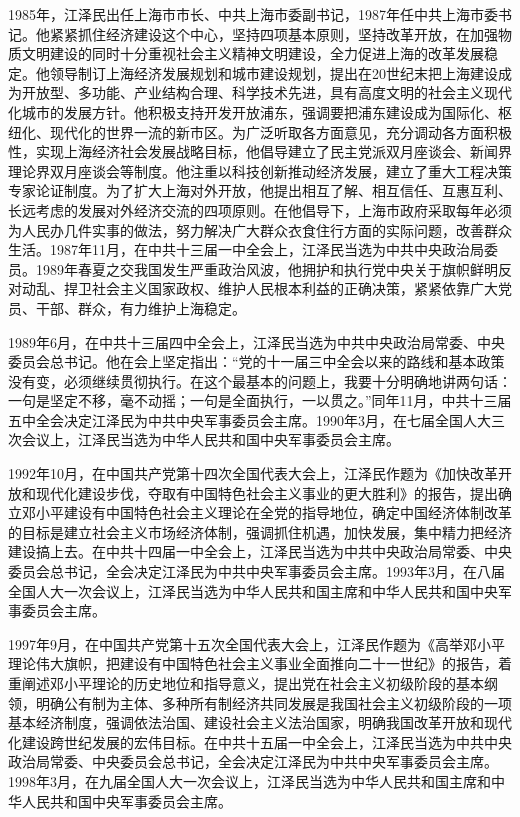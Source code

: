 \documentclass[UTF8, 11pt, oneside]{ctexart}
\begin{document}
1985年，江泽民出任上海市市长、中共上海市委副书记，1987年任中共上海市委书记。他紧紧抓住经济建设这个中心，坚持四项基本原则，坚持改革开放，在加强物质文明建设的同时十分重视社会主义精神文明建设，全力促进上海的改革发展稳定。他领导制订上海经济发展规划和城市建设规划，提出在20世纪末把上海建设成为开放型、多功能、产业结构合理、科学技术先进，具有高度文明的社会主义现代化城市的发展方针。他积极支持开发开放浦东，强调要把浦东建设成为国际化、枢纽化、现代化的世界一流的新市区。为广泛听取各方面意见，充分调动各方面积极性，实现上海经济社会发展战略目标，他倡导建立了民主党派双月座谈会、新闻界理论界双月座谈会等制度。他注重以科技创新推动经济发展，建立了重大工程决策专家论证制度。为了扩大上海对外开放，他提出相互了解、相互信任、互惠互利、长远考虑的发展对外经济交流的四项原则。在他倡导下，上海市政府采取每年必须为人民办几件实事的做法，努力解决广大群众衣食住行方面的实际问题，改善群众生活。1987年11月，在中共十三届一中全会上，江泽民当选为中共中央政治局委员。1989年春夏之交我国发生严重政治风波，他拥护和执行党中央关于旗帜鲜明反对动乱、捍卫社会主义国家政权、维护人民根本利益的正确决策，紧紧依靠广大党员、干部、群众，有力维护上海稳定。

1989年6月，在中共十三届四中全会上，江泽民当选为中共中央政治局常委、中央委员会总书记。他在会上坚定指出：“党的十一届三中全会以来的路线和基本政策没有变，必须继续贯彻执行。在这个最基本的问题上，我要十分明确地讲两句话：一句是坚定不移，毫不动摇；一句是全面执行，一以贯之。”同年11月，中共十三届五中全会决定江泽民为中共中央军事委员会主席。1990年3月，在七届全国人大三次会议上，江泽民当选为中华人民共和国中央军事委员会主席。

1992年10月，在中国共产党第十四次全国代表大会上，江泽民作题为《加快改革开放和现代化建设步伐，夺取有中国特色社会主义事业的更大胜利》的报告，提出确立邓小平建设有中国特色社会主义理论在全党的指导地位，确定中国经济体制改革的目标是建立社会主义市场经济体制，强调抓住机遇，加快发展，集中精力把经济建设搞上去。在中共十四届一中全会上，江泽民当选为中共中央政治局常委、中央委员会总书记，全会决定江泽民为中共中央军事委员会主席。1993年3月，在八届全国人大一次会议上，江泽民当选为中华人民共和国主席和中华人民共和国中央军事委员会主席。

1997年9月，在中国共产党第十五次全国代表大会上，江泽民作题为《高举邓小平理论伟大旗帜，把建设有中国特色社会主义事业全面推向二十一世纪》的报告，着重阐述邓小平理论的历史地位和指导意义，提出党在社会主义初级阶段的基本纲领，明确公有制为主体、多种所有制经济共同发展是我国社会主义初级阶段的一项基本经济制度，强调依法治国、建设社会主义法治国家，明确我国改革开放和现代化建设跨世纪发展的宏伟目标。在中共十五届一中全会上，江泽民当选为中共中央政治局常委、中央委员会总书记，全会决定江泽民为中共中央军事委员会主席。1998年3月，在九届全国人大一次会议上，江泽民当选为中华人民共和国主席和中华人民共和国中央军事委员会主席。
\end{document}
